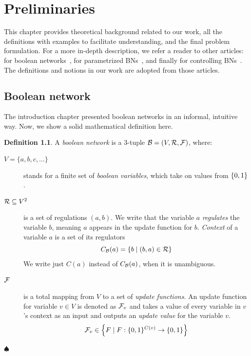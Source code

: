 \documentclass[
	digital, oneside, nosansbold, nocolorbold, nolot, nolof
]{fithesis4}
\theoremstyle{definition}
\newtheorem{definition}{Definition}
\theoremstyle{definition}
\newenvironment{ldefinition}
    {\begin{definition}}
	{\par\hspace{\stretch{1}}$\spadesuit$\hspace{\stretch{1}}
     \par\end{definition}}
\DeclarePairedDelimiter{\set}{\{}{\}}
\begin{document}
\chapter{Preliminaries}

This chapter provides theoretical background related to our work, all the
definitions with examples to facilitate understanding, and the final problem
formulation. For a more in-depth description, we refer a reader to other
articles: for boolean networks~\cite{concepts_bn}, for parametrized
BNs~\cite{kadlecaj_thesis}, and finally for controlling BNs~\cite{infl_max_BN}.
The definitions and notions in our work are adopted from those articles.

\section{Boolean network}

The introduction chapter presented boolean networks in an informal, intuitive
way. Now, we show a solid mathematical definition here.

\begin{ldefinition} \label{def:BN}
A \emph{boolean network} is a 3-tuple $\mathcal{B} = (V, \mathcal{R}, \mathcal{F})$,
where:
\begin{description}
\item[$V = \{a, b, c, \ldots \}$] stands for a finite set of
    \emph{boolean variables}, which take on values from $\set{0, 1}$.
\item[$\mathcal{R} \subseteq V^2$] is a set of regulations $(a, b)$. We write
    that the variable $a$ \emph{regulates} the variable $b$, meaning $a$
    appears in the update function for $b$. \emph{Context} of a variable
    $a$ is a set of its regulators
    \[C_{\BN{B}}(a) = \set{b \mid (b, a) \in \BNRs{R}}\]
    We write just $C(a)$ instead of $C_{\mathcal{B}}(a)$, when it is unambiguous.
\item[$\mathcal{F}$] is a total mapping from $V$ to a set of
    \emph{update functions}. An update function for variable $v \in V$ is
    denoted as $\mathcal{F}_v$ and takes a value of every variable in $v$'s
    context as an input and outputs an \emph{update value} for the variable
    $v$.
    \[
        \BNUFs{F}_v \in \set*{F \mid F: \set{0, 1}^{C(v)} \to \set{0, 1}}
    \]
\end{description}
\end{ldefinition}
\end{document}
